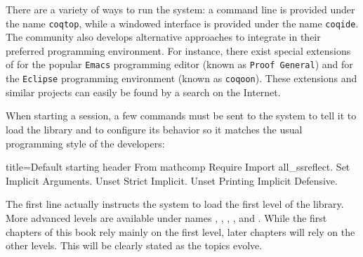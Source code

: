 
There are a variety of ways to run the \Coq{} system: a command line is
provided under the name \texttt{coqtop}, while a windowed interface is
provided under the name \texttt{coqide}.  The \Coq{} community also develops
alternative approaches to integrate \Coq{} in their preferred programming
environment.  For instance, there exist special extensions of \Coq{} for the
popular \texttt{Emacs} programming editor (known as \texttt{Proof General})
and for the \texttt{Eclipse} programming environment
(known as \texttt{coqoon}).  These extensions and similar projects can easily
be found by a search on the Internet.

When starting a \Coq{} session, a few commands must be sent to the \Coq{}
system to tell it to load the \mcbMC{} library and to configure its behavior
so it matches the usual programming style of the \mcbMC{} developers:

\begin{coq}{}{title={Default starting header}}
From mathcomp Require Import all_ssreflect.
Set Implicit Arguments.
Unset Strict Implicit.
Unset Printing Implicit Defensive.
\end{coq}
The first line actually instructs the \Coq{} system to load the first level
of the \mcbMC{} library.  More advanced levels are available under names
, , , ,
and .  While the first chapters of this book
rely mainly on the first
level, later chapters will rely on the other levels.  This will be clearly
stated as the topics evolve.
